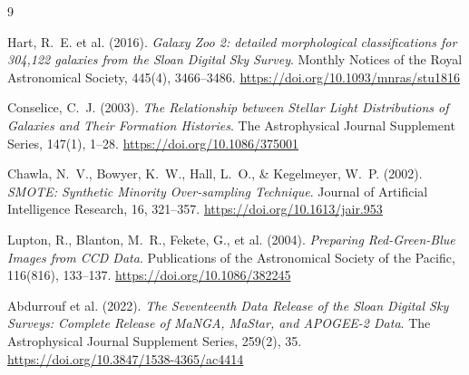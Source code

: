 \documentclass[12pt, a4paper]{article}
\begin{document}
\begin{thebibliography}{9}

Hart, R.~E. et al. (2016).
\textit{Galaxy Zoo 2: detailed morphological classifications for 304,122 galaxies from the Sloan Digital Sky Survey}.
Monthly Notices of the Royal Astronomical Society, 445(4), 3466--3486.
\url{https://doi.org/10.1093/mnras/stu1816}

Conselice, C.~J. (2003).
\textit{The Relationship between Stellar Light Distributions of Galaxies and Their Formation Histories}.
The Astrophysical Journal Supplement Series, 147(1), 1--28.
\url{https://doi.org/10.1086/375001}

Chawla, N.~V., Bowyer, K.~W., Hall, L.~O., \& Kegelmeyer, W.~P. (2002).
\textit{SMOTE: Synthetic Minority Over-sampling Technique}.
Journal of Artificial Intelligence Research, 16, 321--357.
\url{https://doi.org/10.1613/jair.953}

Lupton, R., Blanton, M.~R., Fekete, G., et al. (2004).
\textit{Preparing Red-Green-Blue Images from CCD Data}.
Publications of the Astronomical Society of the Pacific, 116(816), 133--137.
\url{https://doi.org/10.1086/382245}

Abdurrouf et al. (2022).
\textit{The Seventeenth Data Release of the Sloan Digital Sky Surveys: Complete Release of MaNGA, MaStar, and APOGEE-2 Data}.
The Astrophysical Journal Supplement Series, 259(2), 35.
\url{https://doi.org/10.3847/1538-4365/ac4414}

\end{thebibliography}
\end{document}
